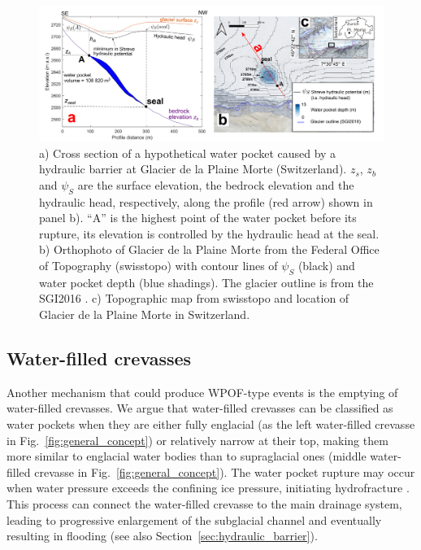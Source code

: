 \begin{figure}
    \centering
    \includegraphics[width=1\linewidth]{chapters/chapter_WPOFs/PlaineMorte_WP_fig.png}
    \caption{a) Cross section of a hypothetical water pocket caused by a hydraulic barrier at Glacier de la Plaine Morte (Switzerland). $z_s$, $z_b$ and $\psi_S$ are the surface elevation, the bedrock elevation and the hydraulic head, respectively, along the profile (red arrow) shown in panel b). ``A'' is the highest point of the water pocket before its rupture, its elevation is controlled by the hydraulic head at the seal. b) Orthophoto of Glacier de la Plaine Morte from the Federal Office of Topography (swisstopo) with contour lines of $\psi_S$ (black) and water pocket depth (blue shadings). The glacier outline is from the SGI2016 \citep{Linsbauer&al2021}. c) Topographic map from swisstopo and location of Glacier de la Plaine Morte in Switzerland.}
    \label{fig:plainemorteWP}
\end{figure}


\subsection{ Water-filled crevasses}

Another mechanism that could produce WPOF-type events is the emptying of water-filled crevasses. We argue that water-filled crevasses can be classified as water pockets when they are either fully englacial (as the left water-filled crevasse in Fig.~\ref{fig:general_concept}) or relatively narrow at their top, making them more similar to englacial water bodies than to supraglacial ones (middle water-filled crevasse in Fig.~\ref{fig:general_concept}). The water pocket rupture may occur when water pressure exceeds the confining ice pressure, initiating hydrofracture  \citep[e.g.][]{Benn&al2009,Scambos&al2009}. This process can connect the water-filled crevasse to the main drainage system, leading to progressive enlargement of the subglacial channel and eventually resulting in flooding (see also Section~\ref{sec:hydraulic_barrier}). 

